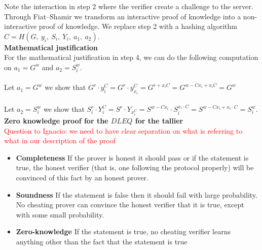 \noindent
Note the interaction in step 2 where the verifier create a challenge to the server. Through Fiat–Shamir we transform an interactive proof of knowledge into a non-interactive proof of knowledge. We replace step 2 with a hashing algorithm  \begin{math}C=H(G,\ y_i,\ S_i,\ Y_i,\ a_1,\ a_2)\end{math}.\\
 
 \noindent
\textbf{Mathematical justification}\\
For the mathematical justification in step 4, we can do the following computation on \begin{math}a_1=G^w\end{math} and \begin{math}a_2=S_i^w\end{math}.\\\\
Let \begin{math}a_1=G^w\end{math} we show that \begin{math}G^r \cdot y_i^C=G^r \cdot y_{x_i}^C=G^{r+x_iC}=G^{w-Cx_i+x_iC}=G^w\end{math}\\\\
Let \begin{math}a_2=S_i^w\end{math} we show that
\begin{math}S_i^r \cdot Y_i^C=S^r \cdot Y_{x_i^C}=S^{w-Cx_i} \cdot S_i^{x_i \cdot C}=S^{w-Cx_i+x_i \cdot C}=S_i^w\end{math}.\\



\noindent
\textbf{Zero knowledge proof for the $DLEQ$ for the tallier}\\
\textcolor{red}{Question to Ignacio: we need to have clear separation on what is referring to what in our description of the proof}
\begin{itemize}
    
    \item \textbf{Completeness} If the prover is honest it should pass or if the statement is true, the honest verifier (that is, one following the protocol properly) will be convinced of this fact by an honest prover.
    
    \item \textbf{Soundness} If the statement is false then it should fail with large probability. No cheating prover can convince
the honest verifier that it is true, except with some small probability.
    
    
    \item \textbf{Zero-knowledge}  If the statement is true, no cheating verifier learns anything other than the fact that the statement is true
\end{itemize}
